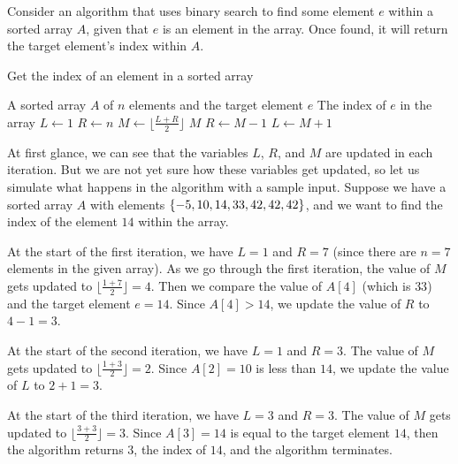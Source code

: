\begin{example}
    Consider an algorithm that uses binary search to find some element $e$ within a sorted array $A$, given that $e$ is an element in the array. Once found, it will return the target element's index within $A$.

    \begin{algorithm}[H]
        \caption{Get the index of an element in a sorted array}
        \begin{algorithmic}[1]
            \Require A sorted array $A$ of $n$ elements and the target element $e$
            \Ensure The index of $e$ in the array
                \State $L \gets 1$
                \State $R \gets n$
                    \State $M \gets \lfloor\frac{L+R}{2}\rfloor$
                        \Return $M$
                        \State $R \gets M-1$
                    \Else
                        \State $L \gets M+1$
                    \EndIf
                \EndWhile
            \EndFunction
        \end{algorithmic}
    \end{algorithm}

    At first glance, we can see that the variables $L$, $R$, and $M$ are updated in each iteration. But we are not yet sure how these variables get updated, so let us simulate what happens in the algorithm with a sample input.
    Suppose we have a sorted array $A$ with elements $\left\{-5, 10, 14, 33, 42, 42, 42\right\}$, and we want to find the index of the element $14$ within the array.

    At the start of the first iteration, we have $L = 1$ and $R = 7$ (since there are $n=7$ elements in the given array). As we go through the first iteration, the value of $M$ gets updated to $\lfloor\frac{1+7}{2}\rfloor = 4$. Then we compare the value of $A[4]$ (which is $33$) and the target element $e = 14$. Since $A[4]>14$, we update the value of $R$ to $4-1 = 3$.

    At the start of the second iteration, we have $L = 1$ and $R = 3$. The value of $M$ gets updated to $\lfloor\frac{1+3}{2}\rfloor = 2$. Since $A[2] = 10$ is less than $14$, we update the value of $L$ to $2+1 = 3$.

    At the start of the third iteration, we have $L=3$ and $R=3$. The value of $M$ gets updated to $\lfloor\frac{3+3}{2}\rfloor = 3$. Since $A[3] = 14$ is equal to the target element $14$, then the algorithm returns $3$, the index of $14$, and the algorithm terminates.


\end{example}
